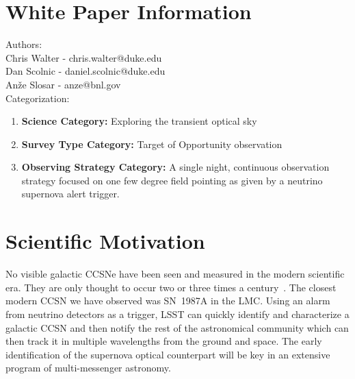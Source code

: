 \documentclass[12pt, letterpaper]{article}
\begin{document}
\newpage

\section{White Paper Information}

\noindent
Authors: \\

\noindent
Chris Walter - chris.walter@duke.edu \\
Dan Scolnic - daniel.scolnic@duke.edu \\
An\v{z}e Slosar - anze@bnl.gov \\

\noindent
Categorization: 
\begin{enumerate} 
\item {\bf Science Category:}  Exploring the transient optical sky
\item {\bf Survey Type Category:}  Target of Opportunity observation
\item {\bf Observing Strategy Category:}  A single night, continuous
  observation strategy focused on one few degree field pointing as given by
  a neutrino supernova alert trigger.
\end{enumerate}  

\clearpage

\section{Scientific Motivation}
\label{sec:motivation}

No visible galactic CCSNe have been seen and measured in the modern
scientific era. They are only thought to occur two or three times a
century~\cite{1994ApJS...92..487T, 2001ASSL..264..199C}.  The closest
modern CCSN we have observed was SN~1987A in the LMC.  Using an alarm
from neutrino detectors as a trigger, LSST can quickly identify and
characterize a galactic CCSN and then notify the rest of the
astronomical community which can then track it in multiple wavelengths
from the ground and space.  The early identification of the supernova
optical counterpart will be key in an extensive program of
multi-messenger astronomy.
\end{document}
